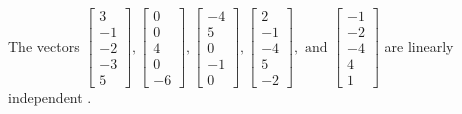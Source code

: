 \begin{exercise}
\begin{exerciseStatement}
  \end{exerciseStatement}
  \begin{exerciseAnswer}
   The vectors \(\left[\begin{array}{r}
3 \\
-1 \\
-2 \\
-3 \\
5
\end{array}\right] , \left[\begin{array}{r}
0 \\
0 \\
4 \\
0 \\
-6
\end{array}\right] , \left[\begin{array}{r}
-4 \\
5 \\
0 \\
-1 \\
0
\end{array}\right] , \left[\begin{array}{r}
2 \\
-1 \\
-4 \\
5 \\
-2
\end{array}\right] , \text{ and } \left[\begin{array}{r}
-1 \\
-2 \\
-4 \\
4 \\
1
\end{array}\right]\) are 
  	 linearly independent  .
  


  \end{exerciseAnswer}
\end{exercise}